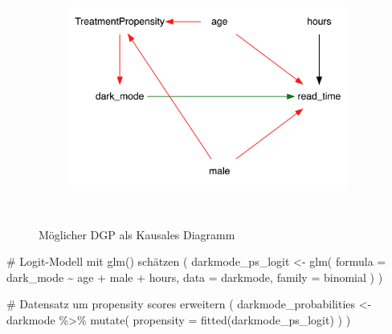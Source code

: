 \documentclass[
  a4paper,
  DIV=11,
  oneside]{scrreprt}
\newenvironment{Shaded}{\begin{snugshade}}{\end{snugshade}}
\newcommand{\NormalTok}[1]{\textcolor[rgb]{0.00,0.23,0.31}{#1}}
\begin{document}
\begin{figure}

{\centering 

\begin{figure}[H]

{\centering \includegraphics[width=4in,height=3in]{Matching_files/figure-latex/dot-figure-2.png}

}

\end{figure}

}

\caption{\label{fig-CDdarkmode2}Möglicher DGP als Kausales Diagramm}

\end{figure}

\begin{Shaded}
\begin{Highlighting}[]
\NormalTok{\# Logit{-}Modell mit \textquotesingle{}glm()\textquotesingle{} schätzen}
\NormalTok{(}
\NormalTok{  darkmode\_ps\_logit \textless{}{-} glm(}
\NormalTok{    formula = dark\_mode \textasciitilde{} age + male + hours,}
\NormalTok{    data = darkmode,}
\NormalTok{    family = binomial}
\NormalTok{  )}
\NormalTok{)}
\end{Highlighting}
\end{Shaded}

\begin{Shaded}
\begin{Highlighting}[]
\NormalTok{\# Datensatz um propensity scores erweitern}
\NormalTok{(}
\NormalTok{  darkmode\_probabilities \textless{}{-} }
\NormalTok{    darkmode \%\textgreater{}\%}
\NormalTok{    mutate(}
\NormalTok{      propensity = fitted(darkmode\_ps\_logit)}
\NormalTok{    )}
\NormalTok{)}
\end{Highlighting}
\end{Shaded}
\end{document}
